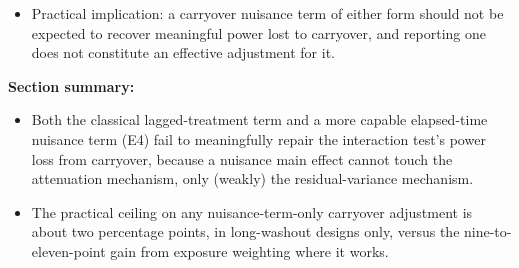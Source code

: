 \documentclass[
  11pt,
]{article}
\providecommand{\tightlist}{%
  \setlength{\itemsep}{0pt}\setlength{\parskip}{0pt}}
\begin{document}
\begin{itemize}
  \begin{itemize}
  \tightlist
  \item
    Type I error at nominal for both (mean 0.050 vs 0.045).
  \item
    Power exceeds the benchmark in all six cells by a mean of 1.3
    points (sign test \(p=0.031\)).
  \item
    Reaches significance under crossover at both half-lives (\(+1.8\),
    \(p=0.008\); \(+2.2\), \(p=0.003\)) and OL+BDC at the longer half-life
    (\(+2.2\), \(p=0.015\)), but not Hybrid (\(+1.0\), \(p=0.27\)).
  \item
    Mechanism matches Section 2.4's prediction: point estimates are
    unchanged (nothing about attenuation is repaired), the entire
    effect runs through the standard error, which only a long enough
    washout gives it something to describe.
  \item
    Crossover places off-drug occasions 2.5 to 10 weeks post-
    discontinuation, against one to two weeks for Hybrid.
  \item
    Practical ceiling on any carryover nuisance term is therefore
    about two percentage points, only in long-washout designs,
    against the nine to eleven points exposure weighting delivers
    where it works.
  \item
    This check covers only the exponential DGP at a single \(N\) and
    effect size, so it is a probe rather than a fourth arm; it shares
    every specification's structural limitation of entering carryover
    as a main effect only (Section 4.6).
  \end{itemize}
\item
  Practical implication: a carryover nuisance term of either form
  should not be expected to recover meaningful power lost to
  carryover, and reporting one does not constitute an effective
  adjustment for it.
\end{itemize}

\textbf{Section summary:}

\begin{itemize}
\tightlist
\item
  Both the classical lagged-treatment term and a more capable
  elapsed-time nuisance term (E4) fail to meaningfully repair the
  interaction test's power loss from carryover, because a nuisance
  main effect cannot touch the attenuation mechanism, only (weakly)
  the residual-variance mechanism.
\item
  The practical ceiling on any nuisance-term-only carryover
  adjustment is about two percentage points, in long-washout designs
  only, versus the nine-to-eleven-point gain from exposure weighting
  where it works.
\end{itemize}
\end{document}
